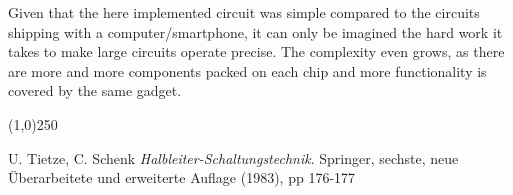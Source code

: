 \documentclass[journal]{IEEEtran}
\begin{document}
Given that the here implemented circuit was simple compared to the circuits
shipping with a computer/smartphone, it can only be imagined the hard work it takes to make
large circuits operate precise. The complexity even grows, as there are more and
more components packed on each chip and more functionality is covered by the
same gadget.


\begin{center}
\line(1,0){250}
\end{center}

\begin{thebibliography}{------}
	U. Tietze, C. Schenk
	{\em Halbleiter-Schaltungstechnik}.
	Springer, sechste, neue Überarbeitete und erweiterte Auflage (1983), pp
	176-177
\end{thebibliography}
\end{document}
